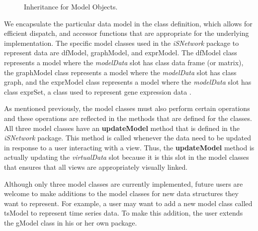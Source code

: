 \documentclass{article}[11pt]
\newcommand{\Rfunction}[1]{{\textbf{#1}}}
\newcommand{\Rpackage}[1]{{\textit{#1}}}
\newcommand{\Rslot}[1]{\textsl{#1}}
\newcommand{\Rclass}[1]{\textsf{#1}}
\begin{document}

\begin{figure}[ht]
  \begin{center}
    \caption{ Inheritance for Model Objects. }
    \label{Fig:Model}
  \end{center}
\end{figure}

We encapsulate the particular data model in the class definition, which allows
for efficient dispatch, and accessor functions that are appropriate for the
underlying implementation.  The specific model classes used in the
\Rpackage{iSNetwork} package to represent data are \Rclass{dfModel},
\Rclass{graphModel}, and \Rclass{exprModel}.  The \Rclass{dfModel} class
represents a model where the \Rslot{modelData} slot has class data frame (or
matrix), the \Rclass{graphModel} class represents a model where the
\Rslot{modelData} slot has class graph, and the \Rclass{exprModel} class
represents a model where the \Rslot{modelData} slot has class exprSet, a class
used to represent gene expression data \cite{BioC}.

As mentioned previously, the model classes must also perform certain
operations and these operations are reflected in the methods that are defined
for the classes.  All three model classes have an \Rfunction{updateModel}
method that is defined in the \Rpackage{iSNetwork} package.  This method is
called whenever the data need to be updated in response to a user interacting
with a view.  Thus, the \Rfunction{updateModel} method is actually updating the
\Rslot{virtualData} slot because it is this slot in the model classes
that ensures that all views are appropriately visually linked.  

Although only three model classes are currently implemented, future
users are welcome to make additions to the model classes for new data
structures they want to represent.  For example, a user may want to add a new
model class called \Rclass{tsModel} to represent time series data.
To make this addition, the user extends the \Rclass{gModel} class in his or
her own package. 
\end{document}

